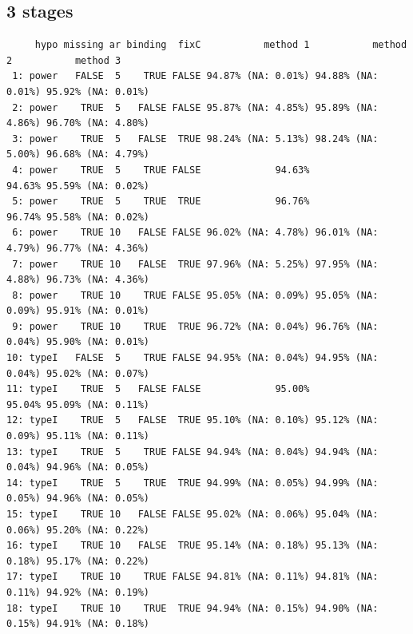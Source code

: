 \documentclass[12pt]{article}
\begin{document}
\clearpage

\subsection{3 stages}
\label{sec:org41e8dfe}
\begin{verbatim}
     hypo missing ar binding  fixC           method 1           method 2           method 3
 1: power   FALSE  5    TRUE FALSE 94.87% (NA: 0.01%) 94.88% (NA: 0.01%) 95.92% (NA: 0.01%)
 2: power    TRUE  5   FALSE FALSE 95.87% (NA: 4.85%) 95.89% (NA: 4.86%) 96.70% (NA: 4.80%)
 3: power    TRUE  5   FALSE  TRUE 98.24% (NA: 5.13%) 98.24% (NA: 5.00%) 96.68% (NA: 4.79%)
 4: power    TRUE  5    TRUE FALSE             94.63%             94.63% 95.59% (NA: 0.02%)
 5: power    TRUE  5    TRUE  TRUE             96.76%             96.74% 95.58% (NA: 0.02%)
 6: power    TRUE 10   FALSE FALSE 96.02% (NA: 4.78%) 96.01% (NA: 4.79%) 96.77% (NA: 4.36%)
 7: power    TRUE 10   FALSE  TRUE 97.96% (NA: 5.25%) 97.95% (NA: 4.88%) 96.73% (NA: 4.36%)
 8: power    TRUE 10    TRUE FALSE 95.05% (NA: 0.09%) 95.05% (NA: 0.09%) 95.91% (NA: 0.01%)
 9: power    TRUE 10    TRUE  TRUE 96.72% (NA: 0.04%) 96.76% (NA: 0.04%) 95.90% (NA: 0.01%)
10: typeI   FALSE  5    TRUE FALSE 94.95% (NA: 0.04%) 94.95% (NA: 0.04%) 95.02% (NA: 0.07%)
11: typeI    TRUE  5   FALSE FALSE             95.00%             95.04% 95.09% (NA: 0.11%)
12: typeI    TRUE  5   FALSE  TRUE 95.10% (NA: 0.10%) 95.12% (NA: 0.09%) 95.11% (NA: 0.11%)
13: typeI    TRUE  5    TRUE FALSE 94.94% (NA: 0.04%) 94.94% (NA: 0.04%) 94.96% (NA: 0.05%)
14: typeI    TRUE  5    TRUE  TRUE 94.99% (NA: 0.05%) 94.99% (NA: 0.05%) 94.96% (NA: 0.05%)
15: typeI    TRUE 10   FALSE FALSE 95.02% (NA: 0.06%) 95.04% (NA: 0.06%) 95.20% (NA: 0.22%)
16: typeI    TRUE 10   FALSE  TRUE 95.14% (NA: 0.18%) 95.13% (NA: 0.18%) 95.17% (NA: 0.22%)
17: typeI    TRUE 10    TRUE FALSE 94.81% (NA: 0.11%) 94.81% (NA: 0.11%) 94.92% (NA: 0.19%)
18: typeI    TRUE 10    TRUE  TRUE 94.94% (NA: 0.15%) 94.90% (NA: 0.15%) 94.91% (NA: 0.18%)
\end{verbatim}
\end{document}
